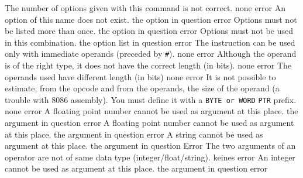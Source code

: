 \documentclass[12pt,twoside]{report}
\newcommand{\tty}[1]{{\tt #1}}
\begin{document}
\begin{description}
               {The number of options given with this command is not
                correct.}
               {none}
               {error}
               {An option of this name does not exist.}
               {the option in question}
               {error}
               {Options must not be listed more than once.}
               {the option in question}
               {error}
               {Options must not be used in this combination.}
               {the option list in question}
               {error}
               {The instruction can be used only with immediate operands
                (preceded by \tty{\#}).}
               {none}
               {error}
               {Although the operand is of the right type, it does not have
                the correct length (in bits).}
               {none}
               {error}
               {The operands used have different length (in bits)}
               {none}
               {error}
               {It is not possible to estimate, from the opcode and from
                the operands, the size of the operand (a trouble with
                8086 assembly). You must define it with a \tty{BYTE or WORD}
                \tty{PTR} prefix.}
               {none}
               {error}
               {A floating point number cannot be used as argument at this place.}
               {the argument in question}
               {error}
               {A floating point number cannot be used as argument at this place.}
               {the argument in question}
               {error}
               {A string cannot be used as argument at this place.}
               {the argument in question}
               {Error}
               {The two arguments of an operator are not of same
                data type (integer/\-float/\-string).}
               {keines}
               {error}
               {An integer cannot be used as argument at this place.}
               {the argument in question}
               {error}

\end{description}
\end{document}
